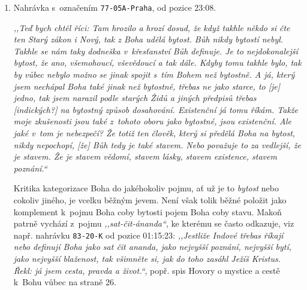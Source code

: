 \begin{enumerate}

\item{%
Nahrávka s~označením \texttt{77-05A-Praha}, od pozice 23:08.

\textit{%
,,Teď bych chtěl říci: Tam hrozilo a hrozí dosud, že když takhle někdo si čte ten
Starý zákon i Nový, tak z Boha udělá bytost. Bůh nikdy bytostí nebyl. Takhle se
nám taky dodneška v~křesťanství Bůh definuje. Je to nejdokonalejší bytost, že
ano, všemohoucí, vševědoucí a tak dále. Kdyby tomu takhle bylo, tak by vůbec
nebylo možno se jinak spojit s~tím Bohem než bytostně. A já, který jsem nechápal
Boha také jinak než bytostně, třebas ne jako starce, to [je] jedno, tak jsem
narazil podle starých Židů a jiných předpisů třebas [indických?] na bytostný
způsob dosahování. Existenční já tomu říkám. Takže moje zkušenosti jsou také
z~tohoto oboru jako bytostné, jsou existenční. Ale jaké v~tom je nebezpečí? Že
totiž ten člověk, který si předělá Boha na bytost, nikdy nepochopí, [že] Bůh tedy je
také stavem. Nebo považuje to za vedlejší, že je stavem. Že je stavem vědomí,
stavem lásky, stavem existence, stavem poznání.``
}

Kritika kategorizace Boha do jakéhokoliv pojmu, ať už je to \textit{bytost} nebo
cokoliv jiného, je vcelku běžným jevem. Není však tolik běžné položit jako
komplement k~pojmu Boha coby bytosti pojem Boha coby stavu. Makoň patrně vychází
z~pojmu \textit{,,sat-čit-ánanda``}, ke kterému se často odkazuje, viz např.
nahrávku \texttt{83-20-K} od pozice 01:15:23: \textit{,,Jestliže Indové třebas
        říkají nebo definují Boha jako sat čit ananda, jako nejvyšší poznání,
        nejvyšší bytí, jako nejvyšší blaženost, tak všimněte si, jak do toho
        zasáhl Ježíš Kristus. Řekl: já jsem cesta, pravda a život.``}, popř.
        spis Hovory o mystice a cestě k~Bohu vůbec na straně
        26\cite{KaMaHovory}.

}
\end{enumerate}
